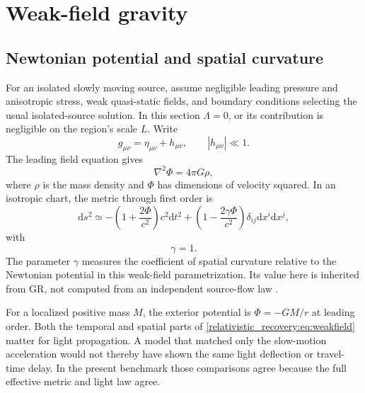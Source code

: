 \documentclass[11pt,oneside]{report}
\newcommand{\Ph}{\Phi}
\newcommand{\dd}{\mathrm d}
\theoremstyle{remark}
\numberwithin{definition}{chapter}
\numberwithin{proposition}{chapter}
\numberwithin{remark}{chapter}
\begin{document}
\section{Weak-field gravity}
\subsection{Newtonian potential and spatial curvature}
For an isolated slowly moving source, assume negligible leading pressure and anisotropic stress, weak quasi-static fields, and boundary conditions selecting the usual isolated-source solution. In this section $\Lambda=0$, or its contribution is negligible on the region's scale $L$. Write
\begin{equation}
g_{\mu\nu}=\eta_{\mu\nu}+h_{\mu\nu},\qquad |h_{\mu\nu}|\ll1.
\label{relativistic_recovery:eq:linearizedmetric}
\end{equation}
The leading field equation gives
\begin{equation}
\nabla^2\Ph=4\pi G\rho,
\label{relativistic_recovery:eq:poisson}
\end{equation}
where $\rho$ is the mass density and $\Ph$ has dimensions of velocity squared. In an isotropic chart, the metric through first order is
\begin{equation}
\dd s^2\simeq-\left(1+\frac{2\Ph}{c^2}\right)c^2\dd t^2+
\left(1-\frac{2\gamma\Ph}{c^2}\right)\delta_{ij}\dd x^i\dd x^j,
\label{relativistic_recovery:eq:weakfield}
\end{equation}
with
\begin{equation}
\gamma=1.
\label{relativistic_recovery:eq:ppngamma}
\end{equation}
The parameter $\gamma$ measures the coefficient of spatial curvature relative to the Newtonian potential in this weak-field parametrization. Its value here is inherited from GR, not computed from an independent source-flow law \parencite{Carroll1997}.

For a localized positive mass $M$, the exterior potential is $\Ph=-GM/r$ at leading order. Both the temporal and spatial parts of \eqref{relativistic_recovery:eq:weakfield} matter for light propagation. A model that matched only the slow-motion acceleration would not thereby have shown the same light deflection or travel-time delay. In the present benchmark those comparisons agree because the full effective metric and light law agree.
\end{document}
